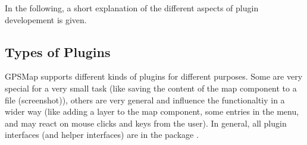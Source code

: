 \documentclass[a4paper]{article} %
\begin{document}
In the following, a short explanation of the different aspects of
plugin developement is given.

\subsection{Types of Plugins}
\label{SoftwareDesignOfTheGpstoolPackage-TypesOfPlugins}

GPSMap supports different kinds of plugins for different
purposes. Some are very special for a very small task (like saving the
content of the map component to a file (screenshot)), others are very
general and influence the functionaltiy in a wider way (like adding a
layer to the map component, some entries in the menu, and may react on
mouse clicks and keys from the user). In general, all plugin
interfaces (and helper interfaces) are in the package
.
\end{document}
